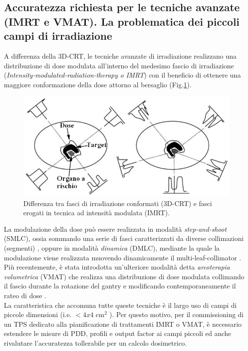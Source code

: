 \subsection{Accuratezza richiesta per le tecniche avanzate (IMRT e VMAT). La problematica dei piccoli campi di irradiazione}
\label{sec:accu_spec}
A differenza della 3D-CRT, le tecniche avanzate di irradiazione realizzano una distribuzione di dose modulata all'interno del medesimo fascio di irradiazione (\textit{Intensity-modulated-radiation-therapy o IMRT}) con il beneficio di ottenere una maggiore conformazione della dose attorno al bersaglio \cite{ICRU2010} (Fig.\ref{fig:3D_IMRT}).\\
\begin{figure}
\centering
\includegraphics[width=\textwidth]{./cap2/3D_IMRT.png}
\caption{Differenza tra fasci di irradiazione conformati (3D-CRT) e fasci erogati in tecnica ad intensità modulata (IMRT).}
\label{fig:3D_IMRT}
\end{figure}
La modulazione della dose può essere realizzata in modalità \textit{step-and-shoot} (SMLC), ossia sommando una serie di fasci caratterizzati da diverse collimazioni (segmenti) \cite{Bortfeld1994}, oppure in modalità \textit{dinamica}  (DMLC), mediante la quale la modulazione viene realizzata muovendo dinamicamente il multi-leaf-collimator \cite{LING1996}. Più recentemente, è stata introdotta un'ulteriore modalità detta \textit{arcoterapia volumetrica} (VMAT) che realizza una distribuzione di dose modulata collimando il fascio durante la rotazione del gantry e modificando contemporaneamente il rateo di dose \cite{Otto2008}.\\
La caratteristica che accomuna tutte queste tecniche è il largo uso di campi di piccole dimensioni (i.e. $<4x4$ cm$^2$ \cite{Das2008}). Per questo motivo, per il commissioning di un TPS dedicato alla pianificazione di trattamenti IMRT o VMAT, è necessario estendere le misure di PDD, profili e output factor ai campi piccoli ed anche rivalutare l'accuratezza tollerabile per un calcolo dosimetrico.

